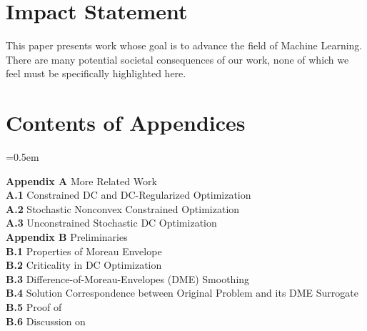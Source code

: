 \documentclass{article}
\theoremstyle{plain}
\theoremstyle{definition}
\theoremstyle{remark}
\numberwithin{equation}{section}
\begin{document}
\section*{Impact Statement}
This paper presents work whose goal is to advance the field of Machine
Learning. There are many potential societal consequences of our work, none of which we feel must be specifically highlighted here.



\newpage
\appendix
\onecolumn

\section*{Contents of Appendices}
\parskip=0.5em

\noindent \textbf{Appendix A} \quad More Related Work \dotfill \pageref{appendix:related_work} \\
\noindent \hspace*{2em} \textbf{A.1} \quad Constrained DC and DC-Regularized Optimization \dotfill \pageref{app:related_work_constrained_dc} \\
\noindent \hspace*{2em} \textbf{A.2} \quad Stochastic Nonconvex Constrained Optimization \dotfill \pageref{app:related_work_stochastic_nonconvex_constrained} \\
\noindent \hspace*{2em} \textbf{A.3} \quad Unconstrained Stochastic DC Optimization \dotfill \pageref{app:related_work_stochastic_dc} \\

\noindent \textbf{Appendix B} \quad Preliminaries \dotfill \pageref{appendix:preliminaries} \\
\noindent \hspace*{2em} \textbf{B.1} \quad Properties of Moreau Envelope \dotfill \pageref{app:moreau_properties} \\
\noindent \hspace*{2em} \textbf{B.2} \quad Criticality in DC Optimization \dotfill \pageref{app:dc_criticality} \\
\noindent \hspace*{2em} \textbf{B.3} \quad Difference-of-Moreau-Envelopes (DME) Smoothing \dotfill \pageref{Subsection: Difference-of-Moreau-Envelopes} \\
\noindent \hspace*{2em} \textbf{B.4} \quad Solution Correspondence between Original Problem and its DME Surrogate \dotfill \pageref{App: Solution Correspondence Theory} \\
\noindent \hspace*{2em} \textbf{B.5} \quad Proof of  \dotfill \pageref{App: proof of prop2.2} \\
\noindent \hspace*{2em} \textbf{B.6} \quad Discussion on  \dotfill \pageref{Appendix: Discussion on Def 2.1} \\
\end{document}
